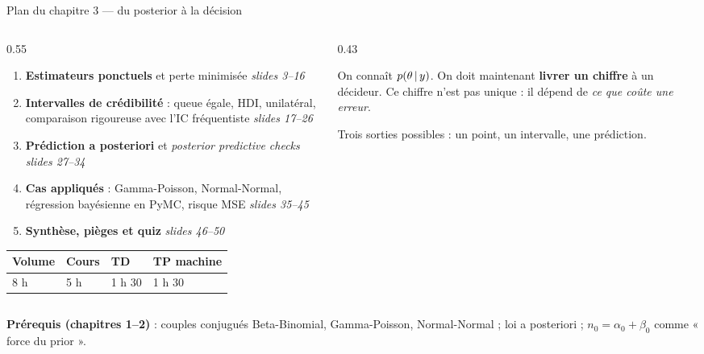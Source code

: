\begin{frame}{Plan du chapitre 3 --- du posterior à la décision}
\footnotesize
\vspace{-2mm}
\begin{columns}[t]
\begin{column}{0.55\textwidth}
\begin{enumerate}
  \item[3.1] \textbf{Estimateurs ponctuels} et perte minimisée \hfill \textit{slides 3--16}
  \item[3.2] \textbf{Intervalles de crédibilité} : queue égale, HDI, unilatéral,
        comparaison rigoureuse avec l'IC fréquentiste \hfill \textit{slides 17--26}
  \item[3.3] \textbf{Prédiction a posteriori} et \textit{posterior predictive checks}
        \hfill \textit{slides 27--34}
  \item[3.4] \textbf{Cas appliqués} : Gamma-Poisson, Normal-Normal, régression
        bayésienne en PyMC, risque MSE \hfill \textit{slides 35--45}
  \item[3.5] \textbf{Synthèse, pièges et quiz} \hfill \textit{slides 46--50}
\end{enumerate}
\vspace{2mm}
\begin{tabular}{@{}llll@{}}
\toprule
\textbf{Volume} & \textbf{Cours} & \textbf{TD} & \textbf{TP machine} \\
\midrule
8 h & 5 h & 1 h 30 & 1 h 30 \\
\bottomrule
\end{tabular}
\end{column}
\begin{column}{0.43\textwidth}
\begin{kbox}
On connaît $p(\theta \,\vert\, y)$. On doit maintenant \textbf{livrer un chiffre} à un
décideur. Ce chiffre n'est pas unique : il dépend de \emph{ce que coûte une erreur}.
\vspace{1.5mm}

\small Trois sorties possibles : \warn{} un point, \warn{} un intervalle,
\warn{} une prédiction.
\end{kbox}
\end{column}
\end{columns}
\vspace{1mm}
\begin{tcolorbox}[colback=byCyan!8,colframe=byCyan,arc=2mm,width=.95\textwidth]
\centering\small
\textbf{Prérequis (chapitres 1--2)} : couples conjugués Beta-Binomial, Gamma-Poisson,
Normal-Normal ; loi a posteriori ; $n_0 = \alpha_0 + \beta_0$ comme « force du prior ».
\end{tcolorbox}
\end{frame}

